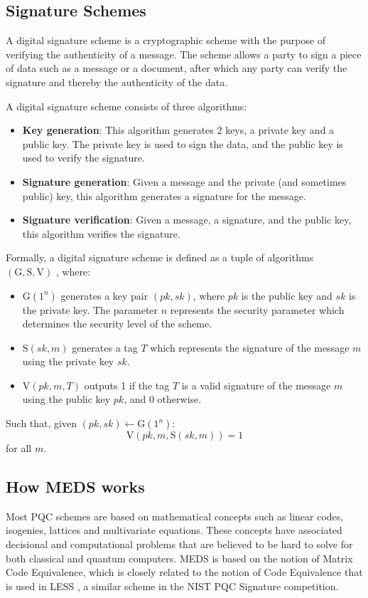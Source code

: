 \documentclass[11pt,a4paper]{report}
\theoremstyle{definition}
\begin{document}
\subsection{Signature Schemes}
\label{sec:signatureschemes}
A digital signature scheme is a cryptographic scheme with the purpose of verifying the authenticity of a message. The scheme allows a party to sign a piece of data such as a message or a document, after which any party can verify the signature and thereby the authenticity of the data.

A digital signature scheme consists of three algorithms:
\begin{itemize}
  \item \textbf{Key generation}: This algorithm generates 2 keys, a private key and a public key. The private key is used to sign the data, and the public key is used to verify the signature.
  \item \textbf{Signature generation}: Given a message and the private (and sometimes public) key, this algorithm generates a signature for the message.
  \item \textbf{Signature verification}: Given a message, a signature, and the public key, this algorithm verifies the signature.
\end{itemize}

Formally, a digital signature scheme is defined as a tuple of algorithms $(\text{G}, \text{S}, \text{V})$ \cite{goldwasser2008lecture}, where:
\begin{itemize}
  \item $\text{G}(1^n)$ generates a key pair $(pk, sk)$, where $pk$ is the public key and $sk$ is the private key. The parameter $n$ represents the security parameter which determines the security level of the scheme.
  \item $\text{S}(sk, m)$ generates a tag $T$ which represents the signature of the message $m$ using the private key $sk$.
  \item $\text{V}(pk, m, T)$ outputs 1 if the tag $T$ is a valid signature of the message $m$ using the public key $pk$, and 0 otherwise.
\end{itemize}
Such that, given $(pk, sk) \leftarrow \text{G}(1^n)$:
\[
  \text{V}(pk, m, \text{S}(sk, m)) = 1
\]
for all $m$.

\subsection{How MEDS works}
\label{sec:medsworks}
Most PQC schemes are based on mathematical concepts such as linear codes, isogenies, lattices and multivariate equations. These concepts have associated decisional and computational problems that are believed to be hard to solve for both classical and quantum computers. MEDS is based on the notion of Matrix Code Equivalence, which is closely related to the notion of Code Equivalence that is used in LESS \cite{biasse2020less}, a similar scheme in the NIST PQC Signature competition.
\end{document}
